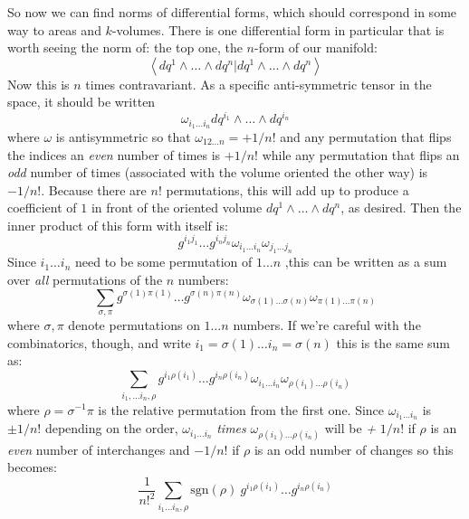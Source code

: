 \documentclass[../master.tex]{subfiles}
\begin{document}
	So now we can find norms of differential forms, which should correspond in some way to areas and $k$-volumes. There is one differential form in particular that is worth seeing the norm of: the top one, the $n$-form of our manifold:
	\begin{equation}
		\left< dq^1 \wedge \dots \wedge dq^n | dq^1 \wedge \dots \wedge dq^n \right>
	\end{equation}
	Now this is $n$ times contravariant. As a specific anti-symmetric tensor in the space, it should be written
	\begin{equation}
		\omega_{i_1\dots i_n} dq^{i_1} \wedge \dots \wedge dq^{i_n}
	\end{equation}
	where $\omega$ is antisymmetric so that $\omega_{12\dots n} = +1/n!$ and any permutation that flips the indices an \emph{even} number of times is $+1/n!$ while any permutation that flips an \emph{odd} number of times (associated with the volume oriented the other way) is $-1/n!$. Because there are $n!$ permutations, this will add up to produce a coefficient of $1$ in front of the oriented volume $dq^1 \wedge \dots \wedge dq^n$, as desired. Then the inner product of this form with itself is:
	\begin{equation}
		g^{i_1 j_1} \dots g^{i_n j_n} \omega_{i_1 \dots i_n} \omega_{j_1 \dots j_n}
	\end{equation}
	Since $i_1 \dots i_n$ need to be some permutation of $1 \dots n$ ,this can be written as a sum over \emph{all} permutations of the $n$ numbers:
	\begin{equation}
		\sum_{\sigma, \pi} g^{\sigma(1) \pi(1)} \dots g^{\sigma(n) \pi(n)} \omega_{\sigma(1) \dots \sigma(n)}  \omega_{\pi(1) \dots \pi(n)}
	\end{equation}
	where $\sigma, \pi$ denote permutations on $1 \dots n$ numbers. If we're careful with the combinatorics, though, and write $i_1=\sigma(1) \dots i_n = \sigma(n)$ this is the same sum as:
	\begin{equation}
		\sum_{i_1, \dots i_n, \rho} g^{i_1 \rho(i_1)} \dots g^{i_n \rho(i_n)} \omega_{i_1 \dots i_n} \omega_{\rho(i_1) \dots \rho(i_n)}
	\end{equation}
	where $\rho = \sigma^{-1} \pi$ is the relative permutation from the first one. Since $\omega_{i_1 \dots i_n}$ is $\pm 1/n!$ depending on the order, $\omega_{i_1 \dots i_n}$ \emph{times} $\omega_{\rho(i_1) \dots \rho(i_n)}$ will be \emph{+} $1/n!$ if $\rho$ is an \emph{even} number of interchanges and $-1/n!$ if $\rho$ is an odd number of changes so this becomes:
	\begin{equation}
		\frac{1}{n!^2} \sum_{i_1 \dots i_n, \rho}  \text{sgn}(\rho) ~ g^{i_1 \rho(i_1)} \dots g^{i_n \rho(i_n)}
	\end{equation}
\end{document}
